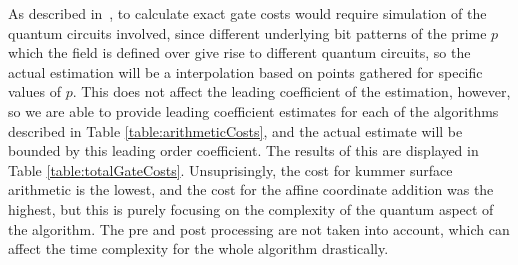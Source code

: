 As described in~\cite{roetteler2017quantum}, to calculate exact gate costs would require simulation of the quantum circuits involved, since different underlying bit patterns of the prime $p$ which the field is defined over give rise to different quantum circuits, so the actual estimation will be a interpolation based on points gathered for specific values of $p$. This does not affect the leading coefficient of the estimation, however, so we are able to provide leading coefficient estimates for each of the algorithms described in Table \ref{table:arithmeticCosts}, and the actual estimate will be bounded by this leading order coefficient. The results of this are displayed in Table \ref{table:totalGateCosts}. Unsuprisingly, the cost for kummer surface arithmetic is the lowest, and the cost for the affine coordinate addition was the highest, but this is purely focusing on the complexity of the quantum aspect of the algorithm. The pre and post processing are not taken into account, which can affect the time complexity for the whole algorithm drastically.
